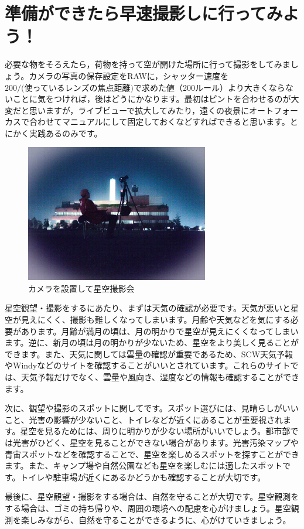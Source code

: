 \documentclass[supernova_2023]{subfiles}
\begin{document}
\section{準備ができたら早速撮影しに行ってみよう！}
必要な物をそろえたら，荷物を持って空が開けた場所に行って撮影をしてみましょう。カメラの写真の保存設定をRAWに，シャッター速度を$200 / \text{(使っているレンズの焦点距離)}$で求めた値（200ルール）より大きくならないことに気をつければ，後はどうにかなります。最初はピントを合わせるのが大変だと思いますが，ライブビューで拡大してみたり，遠くの夜景にオートフォーカスで合わせてマニュアルにして固定しておくなどすればできると思います。とにかく実践あるのみです。
\begin{figure}
  \centering
  \includegraphics[width=8cm]{figures/Yosuke/Hitori.jpg}
  \caption{カメラを設置して星空撮影会}
  \label{fig:Hitori}
\end{figure}
\begin{tcolorbox}[title=星空観望・撮影をいつする？, breakable]
  星空観望・撮影をするにあたり、まずは天気の確認が必要です。天気が悪いと星空が見えにくく、撮影も難しくなってしまいます。月齢や天気などを気にする必要があります。月齢が満月の頃は、月の明かりで星空が見えにくくなってしまいます。逆に、新月の頃は月の明かりが少ないため、星空をより美しく見ることができます。また、天気に関しては雲量の確認が重要であるため、SCW天気予報やWindyなどのサイトを確認することがいいとされています。これらのサイトでは、天気予報だけでなく、雲量や風向き、湿度などの情報も確認することができます。
  
  \phantom{a}\par
  次に、観望や撮影のスポットに関してです。スポット選びには、見晴らしがいいこと、光害の影響が少ないこと、トイレなどが近くにあることが重要視されます。星空を見るためには、周りに明かりが少ない場所がいいでしょう。都市部では光害がひどく、星空を見ることができない場合があります。光害汚染マップや青宙スポットなどを確認することで、星空を楽しめるスポットを探すことができます。また、キャンプ場や自然公園なども星空を楽しむには適したスポットです。トイレや駐車場が近くにあるかどうかも確認することが大切です。
  
  \phantom{a}\par 
  最後に、星空観望・撮影をする場合は、自然を守ることが大切です。星空観測をする場合は、ゴミの持ち帰りや、周囲の環境への配慮を心がけましょう。星空観測を楽しみながら、自然を守ることができるように、心がけていきましょう。
\end{tcolorbox}
\end{document}
